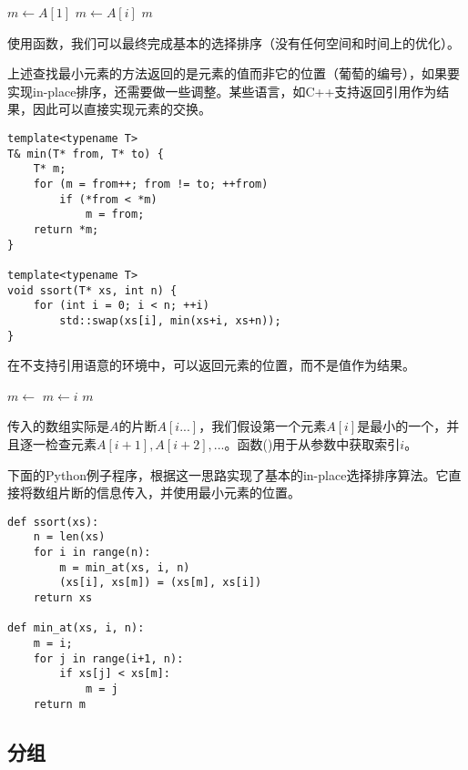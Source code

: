 \documentclass[UTF8]{article}
\begin{document}
\begin{algorithmic}[1]
  \State $m \gets A[1]$
      \State $m \gets A[i]$
    \EndIf
  \EndFor
  \State \Return $m$
\EndFunction
\end{algorithmic}

使用函数，我们可以最终完成基本的选择排序（没有任何空间和时间上的优化）。

上述查找最小元素的方法返回的是元素的值而非它的位置（葡萄的编号），如果要实现in-place排序，还需要做一些调整。某些语言，如C++支持返回引用作为结果，因此可以直接实现元素的交换。

\lstset{language=C++}
\begin{lstlisting}
template<typename T>
T& min(T* from, T* to) {
    T* m;
    for (m = from++; from != to; ++from)
        if (*from < *m)
            m = from;
    return *m;
}

template<typename T>
void ssort(T* xs, int n) {
    for (int i = 0; i < n; ++i)
        std::swap(xs[i], min(xs+i, xs+n));
}
\end{lstlisting}

在不支持引用语意的环境中，可以返回元素的位置，而不是值作为结果。

\begin{algorithmic}[1]
  \State $m \gets$ 
      \State $m \gets i$
    \EndIf
  \EndFor
  \State \Return $m$
\EndFunction
\end{algorithmic}

传入的数组实际是$A$的片断$A[i...]$，我们假设第一个元素$A[i]$是最小的一个，并且逐一检查元素$A[i+1], A[i+2], ...$。函数()用于从参数中获取索引$i$。

下面的Python例子程序，根据这一思路实现了基本的in-place选择排序算法。它直接将数组片断的信息传入，并使用最小元素的位置。

\lstset{language=Python}
\begin{lstlisting}
def ssort(xs):
    n = len(xs)
    for i in range(n):
        m = min_at(xs, i, n)
        (xs[i], xs[m]) = (xs[m], xs[i])
    return xs

def min_at(xs, i, n):
    m = i;
    for j in range(i+1, n):
        if xs[j] < xs[m]:
            m = j
    return m
\end{lstlisting}

\subsection{分组}
\end{document}

